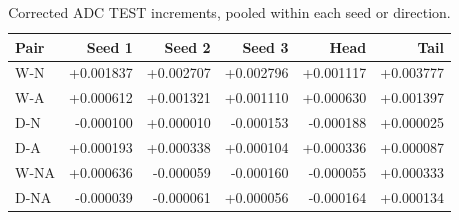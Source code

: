 \begin{table}[htbp]
\centering\small
\caption{Corrected ADC TEST increments, pooled within each seed or direction.}
\label{tab:rerun-consistency}
\begin{tabular}{lrrrrr}
\toprule
Pair & Seed 1 & Seed 2 & Seed 3 & Head & Tail\\
\midrule
W-N & +0.001837 & +0.002707 & +0.002796 & +0.001117 & +0.003777\\
W-A & +0.000612 & +0.001321 & +0.001110 & +0.000630 & +0.001397\\
D-N & -0.000100 & +0.000010 & -0.000153 & -0.000188 & +0.000025\\
D-A & +0.000193 & +0.000338 & +0.000104 & +0.000336 & +0.000087\\
W-NA & +0.000636 & -0.000059 & -0.000160 & -0.000055 & +0.000333\\
D-NA & -0.000039 & -0.000061 & +0.000056 & -0.000164 & +0.000134\\
\bottomrule
\end{tabular}
\end{table}
